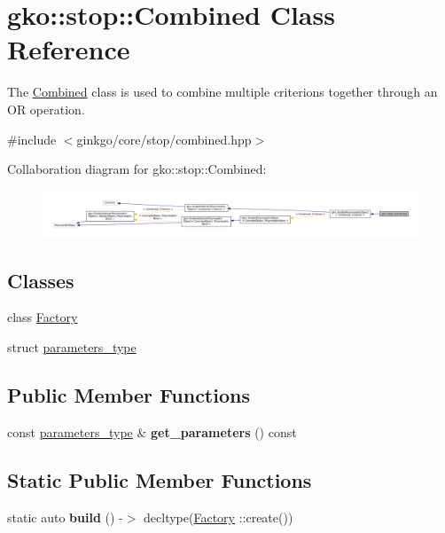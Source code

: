 \hypertarget{classgko_1_1stop_1_1Combined}{}\section{gko\+:\+:stop\+:\+:Combined Class Reference}
\label{classgko_1_1stop_1_1Combined}


The \hyperlink{classgko_1_1stop_1_1Combined}{Combined} class is used to combine multiple criterions together through an OR operation.  




{\ttfamily \#include $<$ginkgo/core/stop/combined.\+hpp$>$}



Collaboration diagram for gko\+:\+:stop\+:\+:Combined\+:
\nopagebreak
\begin{figure}[H]
\begin{center}
\leavevmode
\includegraphics[width=350pt]{classgko_1_1stop_1_1Combined__coll__graph}
\end{center}
\end{figure}
\subsection*{Classes}
\begin{DoxyCompactItemize}
\item 
class \hyperlink{classgko_1_1stop_1_1Combined_1_1Factory}{Factory}
\item 
struct \hyperlink{structgko_1_1stop_1_1Combined_1_1parameters__type}{parameters\+\_\+type}
\end{DoxyCompactItemize}
\subsection*{Public Member Functions}
\begin{DoxyCompactItemize}
\item 
\mbox{\label{classgko_1_1stop_1_1Combined_a0acc22e2dcbbf1493f9acb2fc77dbecd}} 
const \hyperlink{structgko_1_1stop_1_1Combined_1_1parameters__type}{parameters\+\_\+type} \& {\bfseries get\+\_\+parameters} () const
\end{DoxyCompactItemize}
\subsection*{Static Public Member Functions}
\begin{DoxyCompactItemize}
\item 
\mbox{\label{classgko_1_1stop_1_1Combined_a3ffe259b8b3fe34b14ec3e55ec6891a8}} 
static auto {\bfseries build} () -\/$>$ decltype(\hyperlink{classgko_1_1stop_1_1Combined_1_1Factory}{Factory} \+::create())
\end{DoxyCompactItemize}
